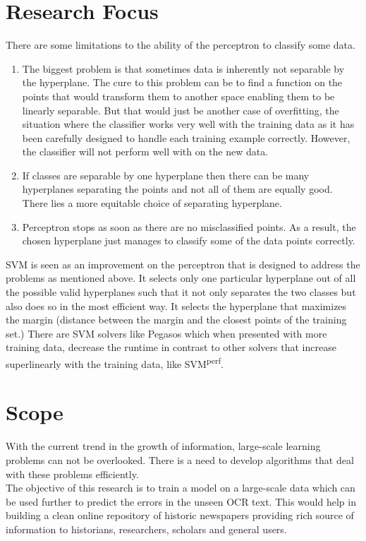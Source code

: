 \documentclass{article}
\begin{document}
\section{Research Focus}
There are some limitations to the ability of the perceptron to classify some data.
\begin{enumerate}
    \item The biggest problem is that sometimes data is inherently not separable by the hyperplane. The cure to this problem can be to find a function on the points that would transform them to another space enabling them to be linearly separable. But that would just be another case of overfitting, the situation where the classifier works very well with the training data as it has been carefully designed to handle each training example correctly. However, the classifier will not perform well with on the new data.
\item If classes are separable by one hyperplane then there can be many hyperplanes separating the points and not all of them are equally good. There lies a more equitable choice of separating hyperplane.
\item Perceptron stops as soon as there are no misclassified points. As a result, the chosen hyperplane just manages to classify some of the data points correctly.
\end{enumerate}
SVM is seen as an improvement on the perceptron that is designed to address the problems as mentioned above. It selects only one particular hyperplane out of all the possible valid hyperplanes such that it not only separates the two classes but also does so in the most efficient way. It selects the hyperplane that maximizes the margin (distance between the margin and the closest points of the training set.)
There are SVM solvers like Pegasos which when presented with more training data, decrease the runtime in contrast to other solvers that increase superlinearly with the training data, like SVM\textsuperscript{perf}.
 
\section{Scope}
With the current trend in the growth of information, large-scale learning problems can not be overlooked. There is a need to develop algorithms that deal with these problems efficiently.\\
The objective of this research is to train a model on a large-scale data which can be used further to predict the errors in the unseen OCR text.
This would help in building a clean online repository of historic newspapers providing rich source of information to historians, researchers, scholars and general users.

\nocite{winnow,wikiedits,carlson1999snow,menon2009large,book,Joachims:1999:MLS:299094.299104,ibm}


\end{document}
